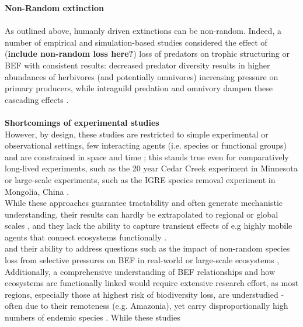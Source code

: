 %
\textbf{Non-Random extinction}\\
\\
As outlined above, humanly driven extinctions can be non-random.
Indeed, a number of empirical \citep{Sih1998,OConnor2008} and simulation-based\citep{Borrvall2000,Ives2005} studies considered the effect of (\textbf{include non-random loss here?}) loss of predators on trophic structuring or BEF with consistent results: 
decreased predator diversity results in higher abundances of herbivores (and potentially omnivores) increasing pressure on primary producers, while intraguild predation and omnivory dampen these cascading effects \citep{Duffy2007}.  \\\\
%
\textbf{Shortcomings of experimental studies}\\
However, by design, these studies are restricted to simple experimental or observational settings, few interacting agents (i.e. species or functional groups) and are constrained in space and time \citep{Dobson2006,Estes2011,Cardinale2012}; this stands true even for comparatively long-lived experiments, such as the 20 year Cedar Creek experiment in Minnesota \citep[][]{Tilman2001} or large-scale experiments, such as the IGRE species removal experiment in Mongolia, China \citep{Wu2015}.\\
While these approaches guarantee tractability and often generate mechanistic understanding, their results can hardly be extrapolated to regional or global scales \citep{Bulling2006,Naeem2012}, and they lack the ability to capture transient effects of e.g highly mobile agents that connect ecosystems functionally \citep{France2006}. \\
and their ability to address questions such as the impact of non-random species loss from selective pressures on BEF in real-world or large-scale ecosystems \citep{Saguin2014,Wardle2011},
Additionally, a comprehensive understanding of BEF relationships and how ecosystems are functionally linked would require extensive research effort, as most regions, especially those at highest risk of biodiversity loss, are understudied - often due to their remoteness (e.g. Amazonia), yet carry disproportionally high numbers of endemic species \citep{Urban2015,Wake2008}. While these studies 
